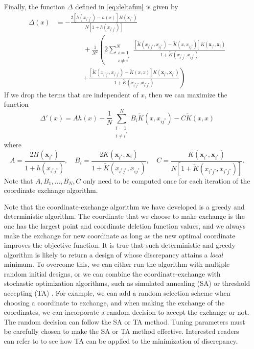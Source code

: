 \documentclass[graybox]{svmult}
\newcommand{\vx}{\boldsymbol{x}}
\newcommand{\tK}{\widetilde{K}}
\begin{document}
Finally, the  function $\Delta$ defined in \eqref{eq:deltafun} is given by
\begin{align}\label{eq:deltafunction}
\nonumber
\Delta(x)
&= -\frac{2\left[  h(x_{i^*j^*})-h(x)    \right]H(\vx_{i^*})}{N[1 + h(x_{i^*j^*})]}   \\
\nonumber
& \qquad \qquad +\frac{1}{N^2}\left(2\sum_{\substack{i=1 \\ i \ne i^*}}^N  \frac{[\tK(x_{i^*j^*},x_{ij^*})-\tK(x,x_{ij^*})] K(\vx_{i^*},\vx_i)} {1 + \tK(x_{i^*j^*},x_{ij^*})} \right . \\
\nonumber
& \qquad \qquad \left . + \frac{[\tK(x_{i^*j^*},x_{i^*j^*})-\tK(x,x)] K(\vx_{i^*},\vx_{i^*})} {1 + \tK(x_{i^*j^*},x_{i^*j^*})} \right )
\end{align} 
If we drop the terms that are independent of $x$, then we can maximize the function
\begin{equation*} %
\Delta'(x) = Ah(x)  - \frac{1}{N}\sum_{\substack{i=1 \\ i \ne i^*}}^N B_i \tK(x,x_{ij^*}) - C \tK(x,x)
\end{equation*}
where
\begin{equation*}
A = \frac{2H(\vx_{i^*})}{1 + h(x_{i^*j^*})}, \quad
B_i  = \frac{2K(\vx_{i^*},\vx_i)} {1 + \tK(x_{i^*j^*},x_{ij^*})}, \quad
C  = \frac{K(\vx_{i^*},\vx_{i^*})} {N[1 + \tK(x_{i^*j^*},x_{i^*j^*})]}.
\end{equation*}
Note that $A, B_1, \ldots, B_N, C$ only need to be computed once for each iteration of the coordinate exchange algorithm.

Note that the coordinate-exchange algorithm we have developed is a greedy and deterministic algorithm. 
The coordinate that we choose to make exchange is the one has the largest point and coordinate deletion function values, and we always make the exchange for new coordinate as long as the new optimal coordinate improves the objective function. 
It is true that such deterministic and greedy algorithm is likely to return a design of whose discrepancy attains a \emph{local} minimum. 
To overcome this, we can either run the algorithm with multiple random initial designs, or we can combine the coordinate-exchange with stochastic optimization algorithms, such as simulated annealing (SA) \cite{kirkpatrick1983optimization} or threshold accepting (TA) \cite{fang2003lower}. 
For example, we can add a random selection scheme when choosing a coordinate to exchange, and when making the exchange of the coordinates, we can incorporate a random decision to accept the exchange or not. 
The random decision can follow the SA or TA method. 
Tuning parameters must be carefully chosen to make the SA or TA method effective. 
Interested readers can refer to \cite{winker1997application} to see how TA can be applied to the minimization of discrepancy. 
\end{document}
